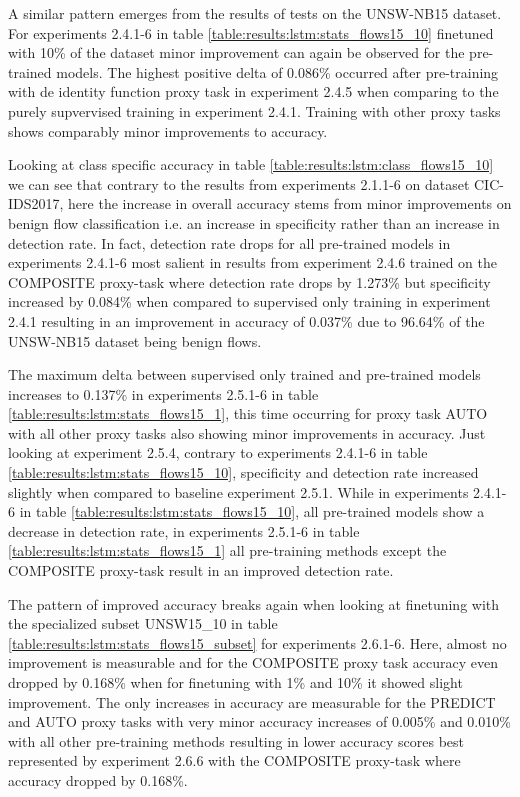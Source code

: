 A similar pattern emerges from the results of tests on the UNSW-NB15 dataset. For experiments 2.4.1-6 in table \ref{table:results:lstm:stats_flows15_10} finetuned with 10\% of the dataset minor improvement can again be observed for the pre-trained models. The highest positive delta of 0.086\% occurred after pre-training with de identity function proxy task in experiment 2.4.5 when comparing to the purely supvervised training in experiment 2.4.1. Training with other proxy tasks shows comparably minor improvements to accuracy. \par
Looking at class specific accuracy in table \ref{table:results:lstm:class_flows15_10} we can see that contrary to the results from experiments 2.1.1-6 on dataset CIC-IDS2017, here the increase in overall accuracy stems from minor improvements on benign flow classification i.e. an increase in specificity rather than an increase in detection rate. In fact, detection rate drops for all pre-trained models in experiments 2.4.1-6 most salient in results from experiment 2.4.6 trained on the COMPOSITE proxy-task where detection rate drops by 1.273\% but specificity increased by 0.084\% when compared to supervised only training in experiment 2.4.1 resulting in an improvement in accuracy of 0.037\% due to 96.64\% of the UNSW-NB15 dataset being benign flows. \par
The maximum delta between supervised only trained and pre-trained models increases to 0.137\% in experiments 2.5.1-6 in table \ref{table:results:lstm:stats_flows15_1}, this time occurring for proxy task AUTO with all other proxy tasks also showing minor improvements in accuracy. Just looking at experiment 2.5.4, contrary to experiments 2.4.1-6 in table  \ref{table:results:lstm:stats_flows15_10}, specificity and detection rate increased slightly when compared to baseline experiment 2.5.1. While in experiments 2.4.1-6 in table \ref{table:results:lstm:stats_flows15_10}, all pre-trained models show a decrease in detection rate, in experiments 2.5.1-6 in table  \ref{table:results:lstm:stats_flows15_1} all pre-training methods except the COMPOSITE proxy-task result in an improved detection rate. \par
The pattern of improved accuracy breaks again when looking at finetuning with the specialized subset UNSW15\_10 in table \ref{table:results:lstm:stats_flows15_subset} for experiments 2.6.1-6. Here, almost no improvement is measurable and for the COMPOSITE proxy task accuracy even dropped by 0.168\% when for finetuning with 1\% and 10\% it showed slight improvement. The only increases in accuracy are measurable for the PREDICT and AUTO proxy tasks with very minor accuracy increases of 0.005\% and 0.010\% with all other pre-training methods resulting in lower accuracy scores best represented by experiment 2.6.6 with the COMPOSITE proxy-task where accuracy dropped by 0.168\%. \par

